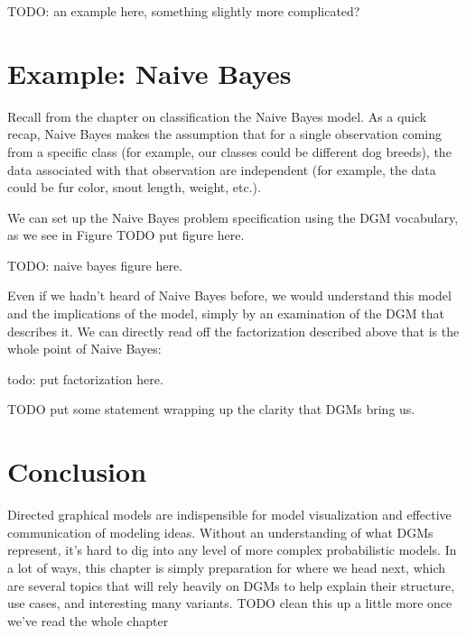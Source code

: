 TODO: an example here, something slightly more complicated?


\section{Example: Naive Bayes}
Recall from the chapter on classification the Naive Bayes model. As a quick recap, Naive Bayes makes the assumption that for a single observation coming from a specific class (for example, our classes could be different dog breeds), the data associated with that observation are independent (for example, the data could be fur color, snout length, weight, etc.).

We can set up the Naive Bayes problem specification using the DGM vocabulary, as we see in Figure TODO put figure here.

TODO: naive bayes figure here.

Even if we hadn't heard of Naive Bayes before, we would understand this model and the implications of the model, simply by an examination of the DGM that describes it. We can directly read off the factorization described above that is the whole point of Naive Bayes:

todo: put factorization here.

TODO put some statement wrapping up the clarity that DGMs bring us.

\section{Conclusion}
Directed graphical models are indispensible for model visualization and effective communication of modeling ideas. Without an understanding of what DGMs represent, it's hard to dig into any level of more complex probabilistic models. In a lot of ways, this chapter is simply preparation for where we head next, which are several topics that will rely heavily on DGMs to help explain their structure, use cases, and interesting many variants. TODO clean this up a little more once we've read the whole chapter
